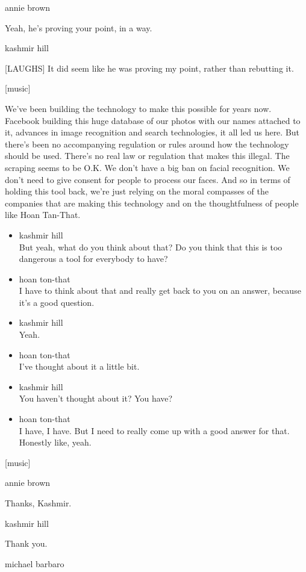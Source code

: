 annie brown

Yeah, he's proving your point, in a way.

kashmir hill

{[}LAUGHS{]} It did seem like he was proving my point, rather than
rebutting it.

{[}music{]}

We've been building the technology to make this possible for years now.
Facebook building this huge database of our photos with our names
attached to it, advances in image recognition and search technologies,
it all led us here. But there's been no accompanying regulation or rules
around how the technology should be used. There's no real law or
regulation that makes this illegal. The scraping seems to be O.K. We
don't have a big ban on facial recognition. We don't need to give
consent for people to process our faces. And so in terms of holding this
tool back, we're just relying on the moral compasses of the companies
that are making this technology and on the thoughtfulness of people like
Hoan Tan-That.

\begin{itemize}
\item
  kashmir hill\\
  But yeah, what do you think about that? Do you think that this is too
  dangerous a tool for everybody to have?
\item
  hoan ton-that\\
  I have to think about that and really get back to you on an answer,
  because it's a good question.
\item
  kashmir hill\\
  Yeah.
\item
  hoan ton-that\\
  I've thought about it a little bit.
\item
  kashmir hill\\
  You haven't thought about it? You have?
\item
  hoan ton-that\\
  I have, I have. But I need to really come up with a good answer for
  that. Honestly like, yeah.
\end{itemize}

{[}music{]}

annie brown

Thanks, Kashmir.

kashmir hill

Thank you.

michael barbaro

